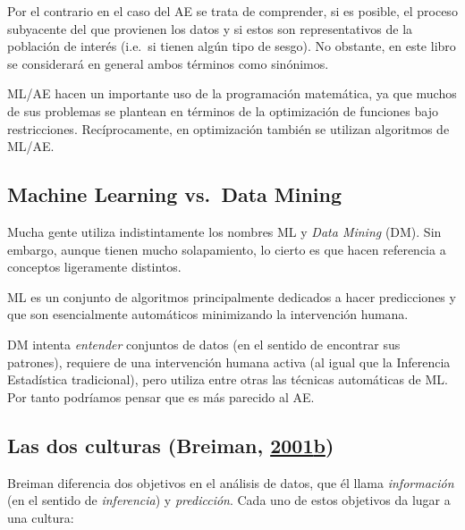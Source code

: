 \documentclass[
  spanish,
]{book}
\theoremstyle{break}
\theoremstyle{definition}
\theoremstyle{definition}
\theoremstyle{definition}
\theoremstyle{remark}
\begin{document}
Por el contrario en el caso del AE se trata de comprender, si es posible, el proceso subyacente del que provienen los datos y si estos son representativos de la población de interés (i.e.~si tienen algún tipo de sesgo).
No obstante, en este libro se considerará en general ambos términos como sinónimos.

ML/AE hacen un importante uso de la programación matemática, ya que muchos de sus problemas se plantean en términos de la optimización de funciones bajo restricciones.
Recíprocamente, en optimización también se utilizan algoritmos de ML/AE.

\hypertarget{machine-learning-vs.-data-mining}{%
\subsection{Machine Learning vs.~Data Mining}\label{machine-learning-vs.-data-mining}}

Mucha gente utiliza indistintamente los nombres ML y \emph{Data Mining} (DM).
Sin embargo, aunque tienen mucho solapamiento, lo cierto es que hacen referencia a conceptos ligeramente distintos.

ML es un conjunto de algoritmos principalmente dedicados a hacer predicciones y que son esencialmente automáticos minimizando la intervención humana.

DM intenta \emph{entender} conjuntos de datos (en el sentido de encontrar sus patrones), requiere de una intervención humana activa (al igual que la Inferencia Estadística tradicional), pero utiliza entre otras las técnicas automáticas de ML. Por tanto podríamos pensar que es más parecido al AE.

\hypertarget{las-dos-culturas-breiman2001statistical}{%
\subsection{\texorpdfstring{Las dos culturas (Breiman, \protect\hyperlink{ref-breiman2001statistical}{2001}\protect\hyperlink{ref-breiman2001statistical}{b})}{Las dos culturas (Breiman, 2001b)}}\label{las-dos-culturas-breiman2001statistical}}

Breiman diferencia dos objetivos en el análisis de datos, que él llama \emph{información} (en el sentido de \emph{inferencia}) y \emph{predicción}.
Cada uno de estos objetivos da lugar a una cultura:
\end{document}
